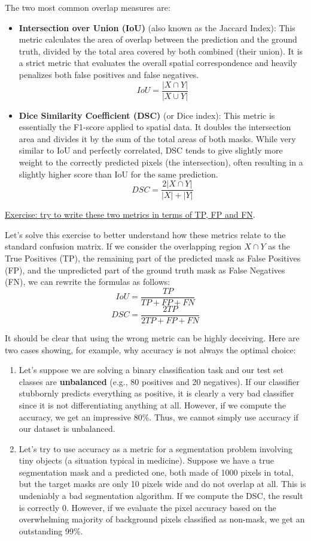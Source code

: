 The two most common overlap measures are:
\begin{itemize}
    \item[-] \textbf{Intersection over Union (IoU)} (also known as the Jaccard Index): This metric calculates the area of overlap between the prediction and the ground truth, divided by the total area covered by both combined (their union). It is a strict metric that evaluates the overall spatial correspondence and heavily penalizes both false positives and false negatives.
    $$IoU = \frac{|X \cap Y|}{|X \cup Y|}$$
    
    \item[-] \textbf{Dice Similarity Coefficient (DSC)} (or Dice index): This metric is essentially the F1-score applied to spatial data. It doubles the intersection area and divides it by the sum of the total areas of both masks. While very similar to IoU and perfectly correlated, DSC tends to give slightly more weight to the correctly predicted pixels (the intersection), often resulting in a slightly higher score than IoU for the same prediction.
    $$DSC = \frac{2|X \cap Y|}{|X| + |Y|}$$
\end{itemize}

\underline{Exercise: try to write these two metrics in terms of TP, FP and FN}.

Let's solve this exercise to better understand how these metrics relate to the standard confusion matrix. If we consider the overlapping region $X \cap Y$ as the True Positives (TP), the remaining part of the predicted mask as False Positives (FP), and the unpredicted part of the ground truth mask as False Negatives (FN), we can rewrite the formulas as follows:
$$ IoU = \frac{TP}{TP + FP + FN} $$
$$ DSC = \frac{2TP}{2TP + FP + FN} $$

It should be clear that using the wrong metric can be highly deceiving. Here are two cases showing, for example, why accuracy is not always the optimal choice:
\begin{enumerate}
    \item Let's suppose we are solving a binary classification task and our test set classes are \textbf{unbalanced} (e.g., 80 positives and 20 negatives). If our classifier stubbornly predicts everything as positive, it is clearly a very bad classifier since it is not differentiating anything at all. However, if we compute the accuracy, we get an impressive 80\%. Thus, we cannot simply use accuracy if our dataset is unbalanced.
    \item Let's try to use accuracy as a metric for a segmentation problem involving tiny objects (a situation typical in medicine). Suppose we have a true segmentation mask and a predicted one, both made of 1000 pixels in total, but the target masks are only 10 pixels wide and do not overlap at all. This is undeniably a bad segmentation algorithm. If we compute the DSC, the result is correctly 0. However, if we evaluate the pixel accuracy based on the overwhelming majority of background pixels classified as non-mask, we get an outstanding 99\%.
\end{enumerate}